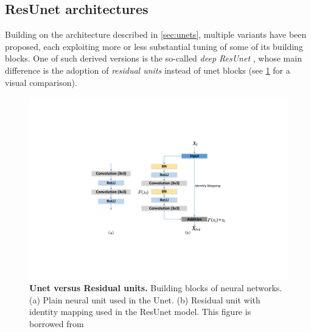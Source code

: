 \subsection{ResUnet architectures}
\label{sec:resunets}

Building on the architecture described in \cref{sec:unets}, multiple variants have been proposed, each exploiting more or less substantial tuning of some of its building blocks.
One of such derived versions is the so-called \textit{deep ResUnet} \cite{deep_resunet}, whose main difference is the adoption of \textit{residual units} \cite{residual_units} instead of unet blocks (see \cref{fig:residual_units}  for a visual comparison).
\begin{figure}
\centerline{
\includegraphics[width=\textwidth]{figures/130_methods/residual_unit.pdf}
}
\caption{\textbf{Unet versus Residual units.} Building blocks of neural networks. (a) Plain neural unit used in the Unet. (b) Residual unit with identity mapping used in the ResUnet model.
This figure is borrowed from \protect {}
} \label{fig:residual_units}
\end{figure}


